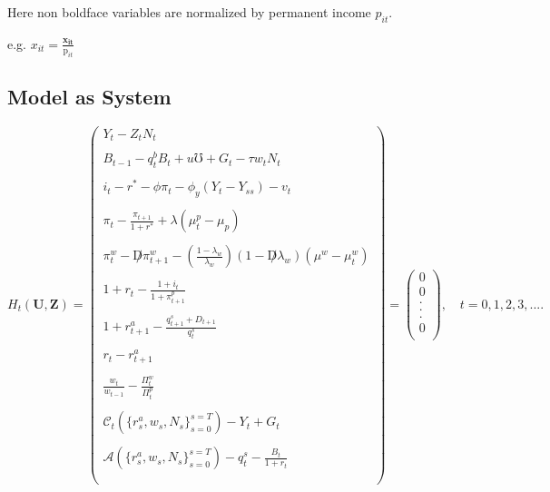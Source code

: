 \documentclass[titlepage]{\econtex}\providecommand{\texname}{BufferStockTheory}
\begin{document}
 Here non boldface variables are normalized by permanent income $\mathit{p_{it}}$. 

e.g. $x_{it} = \frac{\mathbf{x_{it}}}{\pmb{\mathrm{p}}_{it}}$




\hypertarget{Model as System}{}
\subsection{Model as System}

$$
H_{t}(\mathbf{U},\mathbf{Z})= \begin{pmatrix} 
 Y_{t} - Z_{t}N_{t} \\ \\ 
B_{t-1} - q^{b}_{t}B_{t} + u\mho + G_{t} - \tau w_{t} N_{t} \\ \\  
i_{t} - r^{*} - \phi \pi_{t} -\phi_{y}(Y_{t}-Y_{ss}) - v_{t} \\ \\
\pi_{t} -\frac{\pi_{t+1}}{1+r^{*}} + \lambda(\mu_{t}^{p} -\mu_{p})  \\ \\
 \pi_{t}^{w} -\not D \pi_{t+1}^{w} -(\frac{1-\lambda_{w}}{\lambda_{w}}) (1- \not D \lambda_{w}) (\mu^{w} -\mu_{t}^{w}) \\ \\
    1+r_{t} - \frac{1 + i_{t}}{1+ \pi^{p}_{t+1}}\\ \\
 1+r_{t+1}^{a} - \frac{q_{t+1}^{s} +D_{t+1}}{q_{t}^{s}} \\ \\
 r_{t} - r_{t+1}^{a} \\ \\
 \frac{w_{t}}{w_{t-1}} - \frac{\Pi_{t}^{w}}{\Pi_{t}^{p}} \\ \\
 \mathcal{C}_{t}(\{r_{s}^{a} ,w_{s}, N_{s}\}_{s=0}^{s=T}) - Y_{t} + G_{t}  \\ \\
  \mathcal{A}(\{r_{s}^{a} ,w_{s}, N_{s}\}_{s=0}^{s=T}) - q_{t}^{s} - \frac{B_{t}}{1+r_{t}}  \\ \\
 \end{pmatrix} = \begin{pmatrix} 0 \\ 0 \\. \\. \\. \\ 0\\ \end{pmatrix} , \quad t=0,1 ,2,3,....
$$ \\ \\
 
\end{document}
